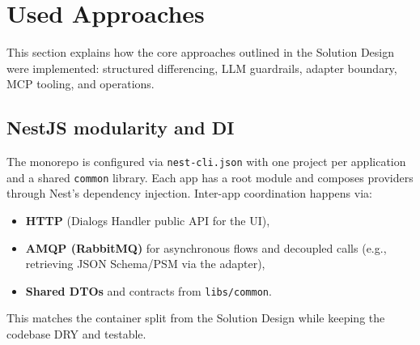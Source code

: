 \section{Used Approaches}
This section explains how the core approaches outlined in the Solution Design were implemented:
structured differencing, LLM guardrails, adapter boundary, MCP tooling, and operations.

\subsection{NestJS modularity and DI}
The monorepo is configured via \texttt{nest-cli.json} with one project per application
and a shared \texttt{common} library. Each app has a root module and composes providers
through Nest’s dependency injection. Inter-app coordination happens via:
\begin{itemize}
  \item \textbf{HTTP} (Dialogs Handler public API for the UI),
  \item \textbf{AMQP (RabbitMQ)} for asynchronous flows and decoupled calls (e.g., retrieving JSON Schema/PSM via the adapter),
  \item \textbf{Shared DTOs} and contracts from \texttt{libs/common}.
\end{itemize}
This matches the container split from the Solution Design while keeping the codebase DRY and testable.

